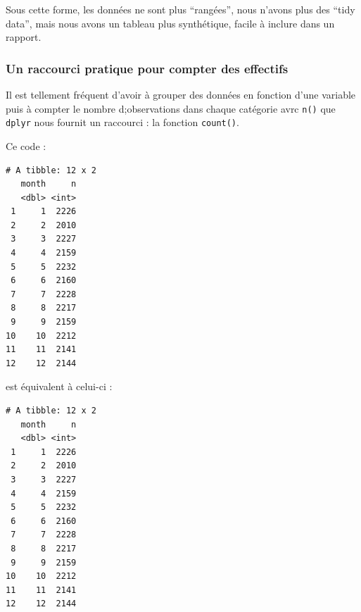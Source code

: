 \documentclass[a4paperpaper,]{article}
\newenvironment{Shaded}{\begin{snugshade}}{\end{snugshade}}
\newcommand{\DataTypeTok}[1]{\textcolor[rgb]{0.00,0.34,0.68}{#1}}
\newcommand{\KeywordTok}[1]{\textcolor[rgb]{0.12,0.11,0.11}{\textbf{#1}}}
\newcommand{\NormalTok}[1]{\textcolor[rgb]{0.12,0.11,0.11}{#1}}
\newcommand{\OperatorTok}[1]{\textcolor[rgb]{0.12,0.11,0.11}{#1}}
\newcommand{\StringTok}[1]{\textcolor[rgb]{0.75,0.01,0.01}{#1}}
\theoremstyle{definition}
\theoremstyle{definition}
\theoremstyle{definition}
\theoremstyle{remark}
\begin{document}
Sous cette forme, les données ne sont plus ``rangées'', nous n'avons
plus des ``tidy data'', mais nous avons un tableau plus synthétique,
facile à inclure dans un rapport.

\hypertarget{un-raccourci-pratique-pour-compter-des-effectifs}{%
\subsubsection{Un raccourci pratique pour compter des
effectifs}\label{un-raccourci-pratique-pour-compter-des-effectifs}}

Il est tellement fréquent d'avoir à grouper des données en fonction
d'une variable puis à compter le nombre d;observations dans chaque
catégorie avrc \texttt{n()} que \texttt{dplyr} nous fournit un raccourci
: la fonction \texttt{count()}.

Ce code :

\begin{Shaded}
\end{Shaded}

\begin{verbatim}
# A tibble: 12 x 2
   month     n
   <dbl> <int>
 1     1  2226
 2     2  2010
 3     3  2227
 4     4  2159
 5     5  2232
 6     6  2160
 7     7  2228
 8     8  2217
 9     9  2159
10    10  2212
11    11  2141
12    12  2144
\end{verbatim}

est équivalent à celui-ci :

\begin{Shaded}
\end{Shaded}

\begin{verbatim}
# A tibble: 12 x 2
   month     n
   <dbl> <int>
 1     1  2226
 2     2  2010
 3     3  2227
 4     4  2159
 5     5  2232
 6     6  2160
 7     7  2228
 8     8  2217
 9     9  2159
10    10  2212
11    11  2141
12    12  2144
\end{verbatim}
\end{document}

